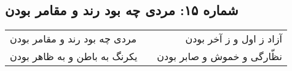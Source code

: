 \begin{center}
\section*{شماره ۱۵: مردی چه بود  رند و مقامر بودن}
\label{sec:015}
\begin{longtable}{l p{0.5cm} r}
مردی چه بود رند و مقامر بودن
&&
آزاد ز اول و ز آخر بودن
\\
یکرنگ به باطن و به ظاهر بودن
&&
نظّارگی و خموش و صابر بودن
\\
\end{longtable}
\end{center}

